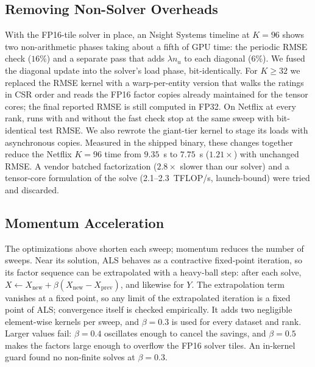 \subsection{Removing Non-Solver Overheads}
\label{ssec:nonsolver}

With the FP16-tile solver in place, an Nsight Systems timeline at $K=96$ shows two non-arithmetic phases taking about a fifth of GPU time: the periodic RMSE check ($16\%$) and a separate pass that adds $\lambda n_u$ to each diagonal ($6\%$). We fused the diagonal update into the solver's load phase, bit-identically. For $K \ge 32$ we replaced the RMSE kernel with a warp-per-entity version that walks the ratings in CSR order and reads the FP16 factor copies already maintained for the tensor cores; the final reported RMSE is still computed in FP32. On Netflix at every rank, runs with and without the fast check stop at the same sweep with bit-identical test RMSE. We also rewrote the giant-tier kernel to stage its loads with asynchronous copies. Measured in the shipped binary, these changes together reduce the Netflix $K=96$ time from $9.35$~s to $7.75$~s ($1.21\times$) with unchanged RMSE. A vendor batched factorization ($2.8\times$ slower than our solver) and a tensor-core formulation of the solve (2.1--2.3~TFLOP/s, launch-bound) were tried and discarded.

\subsection{Momentum Acceleration}
\label{ssec:momentum}

The optimizations above shorten each sweep; momentum reduces the number of sweeps. Near its solution, ALS behaves as a contractive fixed-point iteration, so its factor sequence can be extrapolated with a heavy-ball step: after each solve, $X \leftarrow X_{\text{new}} + \beta (X_{\text{new}} - X_{\text{prev}})$, and likewise for $Y$. The extrapolation term vanishes at a fixed point, so any limit of the extrapolated iteration is a fixed point of ALS; convergence itself is checked empirically. It adds two negligible element-wise kernels per sweep, and $\beta = 0.3$ is used for every dataset and rank. Larger values fail: $\beta = 0.4$ oscillates enough to cancel the savings, and $\beta = 0.5$ makes the factors large enough to overflow the FP16 solver tiles. An in-kernel guard found no non-finite solves at $\beta = 0.3$.

